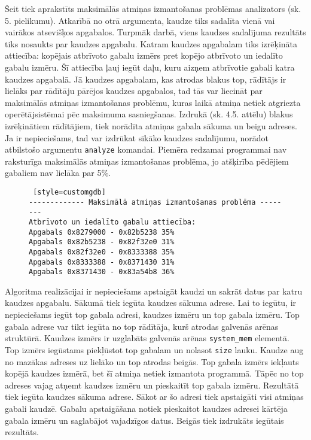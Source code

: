 Šeit tiek aprakstīts maksimālās atmiņas izmantošanas problēmas analizators (sk. 5. pielikumu).
Atkarībā no otrā argumenta, kaudze tiks sadalīta vienā vai vairākos atsevišķos apgabalos.
Turpmāk darbā, viens kaudzes sadalījuma rezultāts tiks nosaukts par kaudzes apgabalu.
Katram kaudzes apgabalam tiks izrēķināta attiecība: kopējais atbrīvoto gabalu izmērs pret kopējo atbrīvoto un iedalīto gabalu izmēru.
Šī attiecība ļauj iegūt daļu, kuru aizņem atbrīvotie gabali katra kaudzes apgabalā.
Jā kaudzes apgabalam, kas atrodas blakus top, rādītājs ir lielāks par rādītāju pārējos kaudzes apgabalos, tad tās var liecināt par maksimālās atmiņas izmantošanas problēmu, kuras laikā atmiņa netiek atgriezta operētājsistēmai pēc maksimuma sasniegšanas.
Izdrukā (sk. 4.5. attēlu) blakus izrēķinātiem rādītājiem, tiek norādīta atmiņas gabala sākuma un beigu adreses.
Ja ir nepieciešams, tad var izdrūkat sīkāko kaudzes sadalījumu, norādot atbilstošo argumentu \texttt{analyze} komandai.
Piemēra redzamai programmai nav raksturīga maksimālās atmiņas izmantošanas problēma, jo atšķirība pēdējiem gabaliem nav lielāka par 5\%.

\begin{figure}[h]
\begin{lstlisting} [style=customgdb]
------------- Maksimālā atmiņas izmantošanas problēma --------
Atbrīvoto un iedalīto gabalu attiecība:
Apgabals 0x8279000 - 0x82b5238 35%
Apgabals 0x82b5238 - 0x82f32e0 31%
Apgabals 0x82f32e0 - 0x8333388 35%
Apgabals 0x8333388 - 0x8371430 31%
Apgabals 0x8371430 - 0x83a54b8 36%
\end{lstlisting}
\caption{\textbf{\fontsize{11}{12}\selectfont {Maksimālā atmiņas izmantošanas rādītājs}}}
\end{figure}

Algoritma realizācijai ir nepieciešams apstaigāt kaudzi un sakrāt datus par katru kaudzes apgabalu.
Sākumā tiek iegūta kaudzes sākuma adrese.
Lai to iegūtu, ir nepieciešams iegūt top gabala adresi, kaudzes izmēru un top gabala izmēru.
Top gabala adrese var tikt iegūta no top rādītāja, kurš atrodas galvenās arēnas struktūrā.
Kaudzes izmērs ir uzglabāts galvenās arēnas \texttt{system\_mem} elementā.
Top izmērs iegūstams piekļūstot top gabalam un nolasot \texttt{size} lauku.
Kaudze aug no mazākas adreses uz lielāko un top atrodas beigās.
Top gabala izmērs iekļauts kopējā kaudzes izmērā, bet šī atmiņa netiek izmantota programmā.
Tāpēc no top adreses vajag atņemt kaudzes izmēru un pieskaitīt top gabala izmēru.
Rezultātā tiek iegūta kaudzes sākuma adrese.
Sākot ar šo adresi tiek apstaigāti visi atmiņas gabali kaudzē.
Gabalu apstaigāšana notiek pieskaitot kaudzes adresei kārtēja gabala izmēru un saglabājot vajadzīgos datus.
Beigās tiek izdrukāts iegūtais rezultāts.



